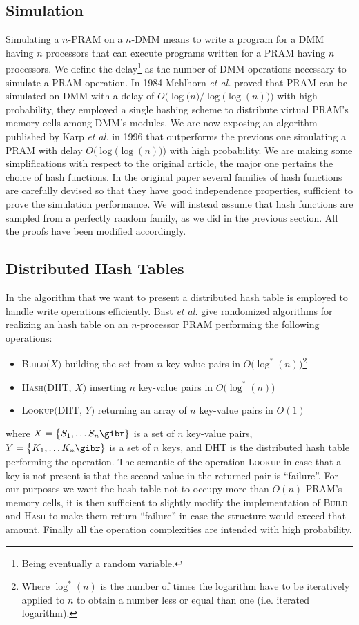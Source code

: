 \subsection{Simulation}
Simulating a $n$-PRAM on a $n$-DMM means to write a program for a DMM having
$n$ processors that can execute programs written for a PRAM having
$n$ processors. We define the delay\footnote{Being eventually
  a random variable.} as the number of DMM operations necessary to simulate
a PRAM operation. In 1984 Mehlhorn {\em et al.} \cite{art} proved that PRAM
can be simulated on DMM with a delay of $O\bigl(\log\bigl(n\bigr)\bigr / \log\bigl(\log(n)\bigr))$
with high probability, they employed a single hashing scheme to
distribute virtual PRAM's
 memory cells among DMM's modules. 
We are now exposing an algorithm published by Karp {\em et al.} \cite{Karp} in
1996 that
outperforms the previous one simulating a PRAM with delay
$O\bigl(\log\bigl(\log(n)\bigr)\bigr)$ with high probability.
We are making some simplifications with respect to the original article,
the major one pertains the choice of hash functions.
In the original paper several families of hash
functions are carefully
devised so that they have good independence properties,
sufficient to prove the simulation 
performance. We will instead assume that hash functions are sampled from
a perfectly random family, as we did in the previous section. All the proofs
have been modified accordingly.

\subsection{Distributed Hash Tables}
In the algorithm that we want to present a distributed hash
table is employed to handle write operations efficiently.
Bast {\em et al.} \cite{Bast}
give randomized algorithms for realizing an hash table on an $n$-processor PRAM
performing the following operations:
\begin{itemize}
\item \textsc{Build}$\bigl(X\bigr)$ building the set from $n$ key-value
  pairs in $O\bigl(\log^*(n)\bigr)$\footnote{Where $\log^*(n)$ is the number of
    times the logarithm have to be iteratively applied to $n$ to obtain a number
    less or equal than one (i.e. iterated logarithm).}
\item \textsc{Hash}$\bigl(\text{DHT, }X\bigr)$ inserting $n$ key-value pairs in  
  $O\bigl(\log^*(n)\bigr)$
\item \textsc{Lookup}$\bigl(\text{DHT, }Y\bigr)$ returning an array of $n$ key-value pairs in $O(1)$
\end{itemize}
where $X = \bigl\{S_1, \dots S_n\gibr\}$ is a set of $n$ key-value pairs,
$Y = \bigl\{K_1, \dots K_n\gibr\}$ is a set of $n$ keys, and DHT is the
distributed hash table performing the operation.
The semantic of the operation \textsc{Lookup} in case that a key is not present is that
the second value in the returned pair is ``failure''. For our purposes we want
the hash table not to occupy more than $O(n)$ PRAM's memory cells, it is
then sufficient to slightly modify the implementation of \textsc{Build} and
\textsc{Hash}
to make them return ``failure'' in case the structure would exceed that amount.
Finally all the operation complexities are intended with high probability.

